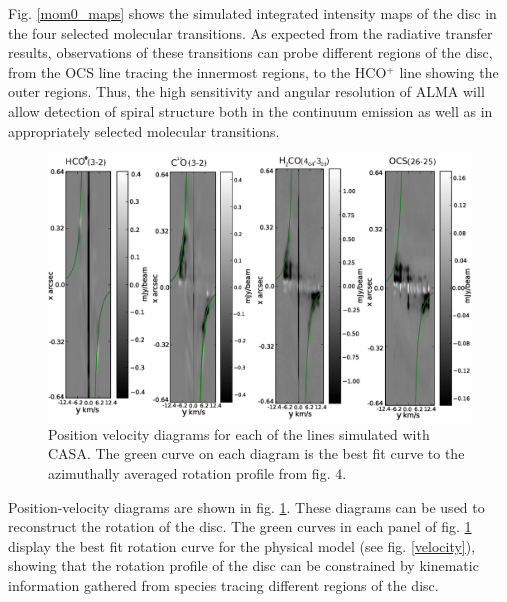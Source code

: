 \documentclass[useAMS,usenatbib]{mn2e}
\begin{document}
Fig. \ref{mom0_maps} shows the simulated integrated intensity maps of the disc in the four selected molecular transitions. As expected from the radiative transfer results, observations of these transitions can probe different regions of the disc, from the OCS line tracing the innermost regions, to the HCO$^+$ line showing the outer regions. Thus, the high sensitivity and angular resolution of ALMA will allow detection of spiral structure both in the continuum emission as well as  in appropriately selected molecular transitions.\smallskip

\begin{figure}
 \includegraphics[width=180mm]{Figures/sim/fig14.eps}
 \caption{Position velocity diagrams for each of the lines simulated with CASA. The green curve on each diagram is the best fit curve to the azimuthally averaged rotation profile from fig. 4.}
 \label{pvs}
\end{figure}

Position-velocity diagrams are shown in fig. \ref{pvs}. These diagrams can be used to reconstruct the rotation of the disc. The green curves in each panel of fig. \ref{pvs} display the best fit rotation curve for the physical model (see fig. \ref{velocity}), showing that the rotation profile of the disc can be constrained by kinematic information gathered from species tracing different regions of the disc.\smallskip
\end{document}
